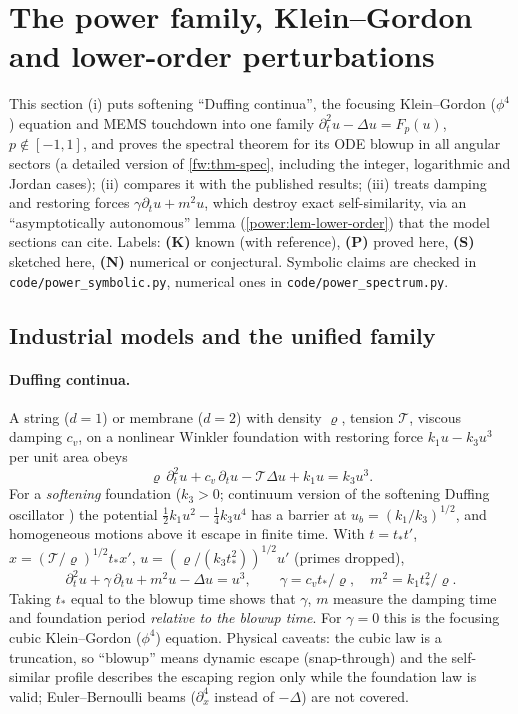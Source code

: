 \section{The power family, Klein--Gordon and lower-order perturbations}
\label{power:sec}

This section (i) puts softening ``Duffing continua'', the focusing
Klein--Gordon ($\phi^4$) equation and MEMS touchdown into one family
$\partial_t^2u-\Delta u=F_p(u)$, $p\notin[-1,1]$, and proves the spectral
theorem for its ODE blowup in all angular sectors (a detailed version of
\cref{fw:thm-spec}, including the integer, logarithmic and Jordan cases);
(ii) compares it with the published results; (iii) treats damping and
restoring forces $\gamma\partial_tu+m^2u$, which destroy exact self-similarity,
via an ``asymptotically autonomous'' lemma (\cref{power:lem-lower-order}) that
the model sections can cite. Labels: \textbf{(K)} known (with reference),
\textbf{(P)} proved here, \textbf{(S)} sketched here, \textbf{(N)} numerical or
conjectural. Symbolic claims are checked in \texttt{code/power\_symbolic.py},
numerical ones in \texttt{code/power\_spectrum.py}.

\subsection{Industrial models and the unified family}
\label{power:subsec-models}

\paragraph{Duffing continua.} A string ($d=1$) or membrane ($d=2$) with density
$\varrho$, tension $\mathcal T$, viscous damping $c_v$, on a nonlinear Winkler
foundation with restoring force $k_1u-k_3u^3$ per unit area obeys
\begin{equation}\label{power:eq-duffing}
  \varrho\,\partial_t^2u+c_v\,\partial_tu-\mathcal T\Delta u+k_1u=k_3u^3 .
\end{equation}
For a \emph{softening} foundation ($k_3>0$; continuum version of the softening
Duffing oscillator \cite{NayfehMook1979,KovacicBrennan2011}) the potential
$\frac12k_1u^2-\frac14k_3u^4$ has a barrier at $u_b=(k_1/k_3)^{1/2}$, and
homogeneous motions above it escape in finite time. With $t=t_*t'$,
$x=(\mathcal T/\varrho)^{1/2}t_*x'$, $u=(\varrho/(k_3t_*^2))^{1/2}u'$ (primes dropped),
\begin{equation}\label{power:eq-nlkg}
  \partial_t^2u+\gamma\,\partial_tu+m^2u-\Delta u=u^3,\qquad
  \gamma=c_vt_*/\varrho,\quad m^2=k_1t_*^2/\varrho .
\end{equation}
Taking $t_*$ equal to the blowup time shows that $\gamma$, $m$ measure the
damping time and foundation period \emph{relative to the blowup time}. For
$\gamma=0$ this is the focusing cubic Klein--Gordon ($\phi^4$) equation.
Physical caveats: the cubic law is a truncation, so ``blowup'' means dynamic
escape (snap-through) and the self-similar profile describes the escaping
region only while the foundation law is valid; Euler--Bernoulli beams
($\partial_x^4$ instead of $-\Delta$) are not covered.

